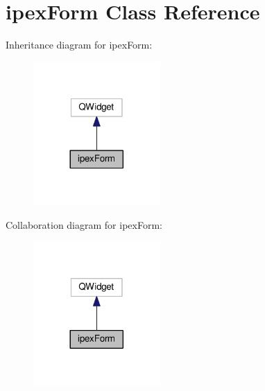 \hypertarget{classipex_form}{}\section{ipex\+Form Class Reference}
\label{classipex_form}


Inheritance diagram for ipex\+Form\+:
\nopagebreak
\begin{figure}[H]
\begin{center}
\leavevmode
\includegraphics[width=137pt]{classipex_form__inherit__graph}
\end{center}
\end{figure}


Collaboration diagram for ipex\+Form\+:
\nopagebreak
\begin{figure}[H]
\begin{center}
\leavevmode
\includegraphics[width=137pt]{classipex_form__coll__graph}
\end{center}
\end{figure}
